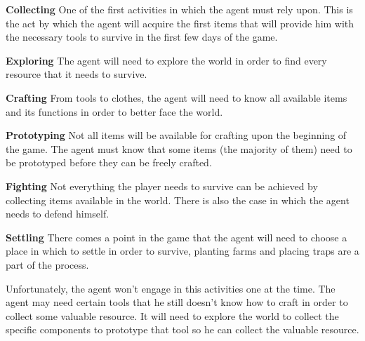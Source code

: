 \begin{description}
	\item \textbf{Collecting} One of the first activities in which the agent must rely upon.
This is the act by which the agent will acquire the first items that will provide him with the necessary tools to survive in the first few days of the game.
	\item \textbf{Exploring} The agent will need to explore the world in order to find every resource that it needs to survive.
	\item \textbf{Crafting} From tools to clothes, the agent will need to know all available items and its functions in order to better face the world.
	\item \textbf{Prototyping} Not all items will be available for crafting upon the beginning of the game.
The agent must know that some items (the majority of them) need to be prototyped before they can be freely crafted.
	\item \textbf{Fighting} Not everything the player needs to survive can be achieved by collecting items available in the world.
There is also the case in which the agent needs to defend himself.
	\item \textbf{Settling} There comes a point in the game that the agent will need to choose a place in which to settle in order to survive, planting farms and placing traps are a part of the process.
\end{description}

Unfortunately, the agent won't engage in this activities one at the time.
The agent may need certain tools that he still doesn't know how to craft in order to collect some valuable resource.
It will need to explore the world to collect the specific components to prototype that tool so he can collect the valuable resource.
